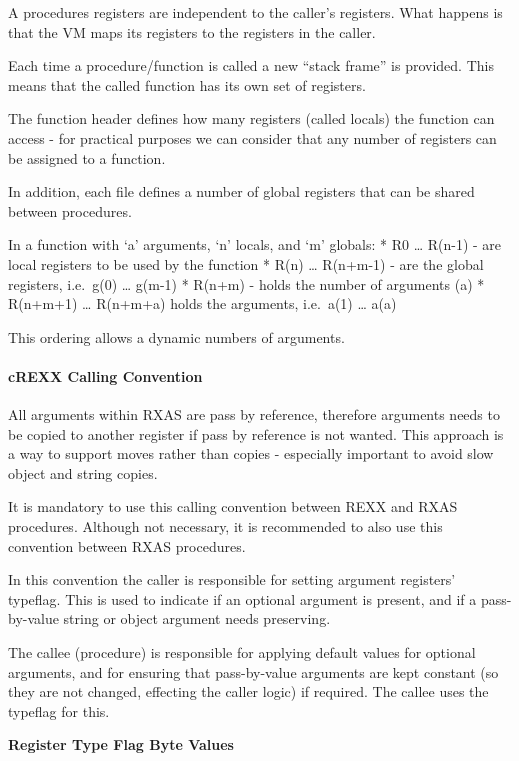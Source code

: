 A procedures registers are independent to the caller's registers. What
happens is that the VM maps its registers to the registers in the
caller.

Each time a procedure/function is called a new ``stack frame'' is
provided. This means that the called function has its own set of
registers.

The function header defines how many registers (called locals) the
function can access - for practical purposes we can consider that any
number of registers can be assigned to a function.

In addition, each file defines a number of global registers that can be
shared between procedures.

In a function with `a' arguments, `n' locals, and `m' globals: * R0
\ldots{} R(n-1) - are local registers to be used by the function * R(n)
\ldots{} R(n+m-1) - are the global registers, i.e.~g(0) \ldots{} g(m-1)
* R(n+m) - holds the number of arguments (a) * R(n+m+1) \ldots{}
R(n+m+a) holds the arguments, i.e.~a(1) \ldots{} a(a)

This ordering allows a dynamic numbers of arguments.

\hypertarget{crexx-calling-convention}{%
\paragraph{cREXX Calling Convention}\label{crexx-calling-convention}}

All arguments within RXAS are pass by reference, therefore arguments
needs to be copied to another register if pass by reference is not
wanted. This approach is a way to support moves rather than copies -
especially important to avoid slow object and string copies.

It is mandatory to use this calling convention between REXX and RXAS
procedures. Although not necessary, it is recommended to also use this
convention between RXAS procedures.

In this convention the caller is responsible for setting argument
registers' typeflag. This is used to indicate if an optional argument is
present, and if a pass-by-value string or object argument needs
preserving.

The callee (procedure) is responsible for applying default values for
optional arguments, and for ensuring that pass-by-value arguments are
kept constant (so they are not changed, effecting the caller logic) if
required. The callee uses the typeflag for this.

\textbf{Register Type Flag Byte Values}

